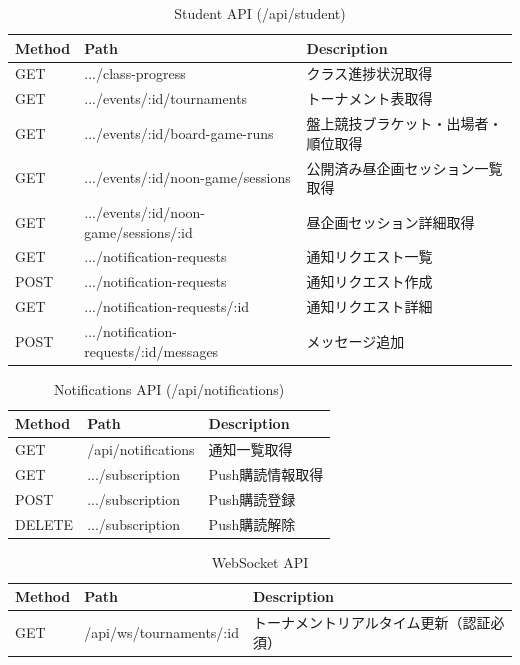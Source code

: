 \documentclass[paper=a4, fontsize=11pt]{jlreq}
\begin{document}
\begin{table}[H]
    \centering
    \caption{Student API (/api/student)}
    \begin{tabularx}{\textwidth}{|l|l|X|}
        \toprule
        Method & Path & Description \\
        \midrule
        GET & .../class-progress & クラス進捗状況取得 \\
        GET & .../events/:id/tournaments & トーナメント表取得 \\
        GET & .../events/:id/board-game-runs & 盤上競技ブラケット・出場者・順位取得 \\
        GET & .../events/:id/noon-game/sessions & 公開済み昼企画セッション一覧取得 \\
        GET & .../events/:id/noon-game/sessions/:id & 昼企画セッション詳細取得 \\
        GET & .../notification-requests & 通知リクエスト一覧 \\
        POST & .../notification-requests & 通知リクエスト作成 \\
        GET & .../notification-requests/:id & 通知リクエスト詳細 \\
        POST & .../notification-requests/:id/messages & メッセージ追加 \\
        \bottomrule
    \end{tabularx}
\end{table}

\begin{table}[H]
    \centering
    \caption{Notifications API (/api/notifications)}
    \begin{tabularx}{\textwidth}{|l|l|X|}
        \toprule
        Method & Path & Description \\
        \midrule
        GET & /api/notifications & 通知一覧取得 \\
        GET & .../subscription & Push購読情報取得 \\
        POST & .../subscription & Push購読登録 \\
        DELETE & .../subscription & Push購読解除 \\
        \bottomrule
    \end{tabularx}
\end{table}

\begin{table}[H]
    \centering
    \caption{WebSocket API}
    \begin{tabularx}{\textwidth}{|l|l|X|}
        \toprule
        Method & Path & Description \\
        \midrule
        GET & /api/ws/tournaments/:id & トーナメントリアルタイム更新（認証必須） \\
        \bottomrule
    \end{tabularx}
\end{table}
\end{document}
